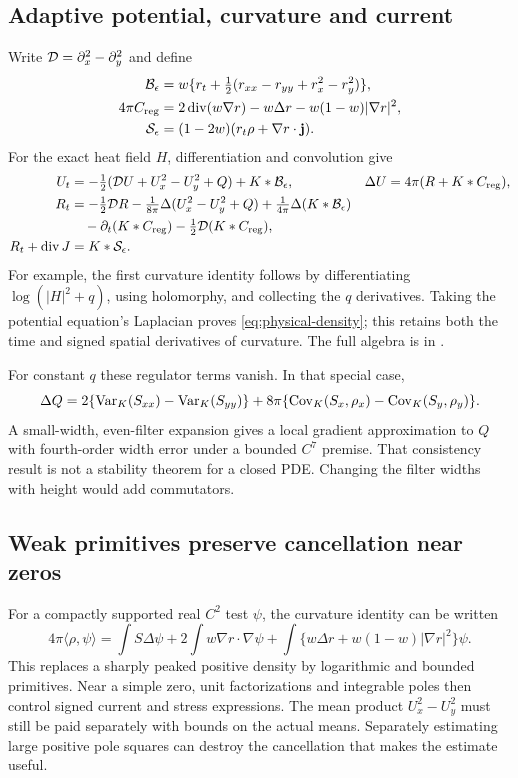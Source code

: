 \subsection{Adaptive potential, curvature and current}
Write $\mathcal D=\partial_x^2-\partial_y^2$ and define
\begin{align}
 \mathcal B_\epsilon&=w\{r_t+\tfrac12(r_{xx}-r_{yy}+r_x^2-r_y^2)\},\\
 4\pi C_{\rm reg}&=2\operatorname{div}(w\nabla r)-w\Delta r
                                     -w(1-w)|\nabla r|^2,\\
 \mathcal S_\epsilon&=(1-2w)(r_t\rho+\nabla r\cdot\mathbf j).
 \label{eq:regulator-corrections}
\end{align}
For the exact heat field $H$, differentiation and convolution give
\begin{align}
 U_t&=-\tfrac12(\mathcal D U+U_x^2-U_y^2+Q)+K*\mathcal B_\epsilon,
 &\Delta U&=4\pi(R+K*C_{\rm reg}),\label{eq:physical-potential}\\
 R_t&=-\tfrac12\mathcal D R-\tfrac1{8\pi}\Delta(U_x^2-U_y^2+Q)
       +\tfrac1{4\pi}\Delta(K*\mathcal B_\epsilon)\notag\\
       &\hspace{1em}-\partial_t(K*C_{\rm reg})-\tfrac12\mathcal D(K*C_{\rm reg}),
 \label{eq:physical-density}\\
 R_t+\operatorname{div}J&=K*\mathcal S_\epsilon.
 \label{eq:physical-current}
\end{align}
For example, the first curvature identity follows by differentiating
$\log(|H|^2+q)$, using holomorphy, and collecting the $q$ derivatives.
Taking the potential equation's Laplacian proves
\eqref{eq:physical-density}; this retains both the time and signed
spatial derivatives of curvature. The full algebra is in \cite{parent}.

For constant $q$ these regulator terms vanish. In that special case,
\[
 \Delta Q=2\{\operatorname{Var}_K(S_{xx})-\operatorname{Var}_K(S_{yy})\}
 +8\pi\{\operatorname{Cov}_K(S_x,\rho_x)-\operatorname{Cov}_K(S_y,\rho_y)\}.
\]
A small-width, even-filter expansion gives a local gradient approximation
to $Q$ with fourth-order width error under a bounded $C^7$ premise.
That consistency result is not a stability theorem for a closed PDE.
Changing the filter widths with height would add commutators.

\subsection{Weak primitives preserve cancellation near zeros}
For a compactly supported real $C^2$ test $\psi$, the curvature identity
can be written
\begin{equation}
 4\pi\langle\rho,\psi\rangle
 =\int S\Delta\psi+2\int w\nabla r\cdot\nabla\psi
       +\int\{w\Delta r+w(1-w)|\nabla r|^2\}\psi.
 \label{eq:weak-density}
\end{equation}
This replaces a sharply peaked positive density by logarithmic and
bounded primitives. Near a simple zero, unit factorizations and
integrable poles then control signed current and stress expressions.
The mean product $U_x^2-U_y^2$ must still be paid separately with
bounds on the actual means. Separately estimating large positive pole
squares can destroy the cancellation that makes the estimate useful.

